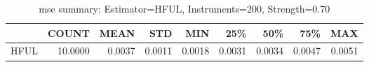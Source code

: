 \begin{table}[ht]
\centering
\caption{mse summary: Estimator=HFUL, Instruments=200, Strength=0.70}
\begin{tabular}{lrrrrrrrr}
\toprule
 & COUNT & MEAN & STD & MIN & 25\% & 50\% & 75\% & MAX \\
\midrule
HFUL & 10.0000 & 0.0037 & 0.0011 & 0.0018 & 0.0031 & 0.0034 & 0.0047 & 0.0051 \\
\bottomrule
\end{tabular}
\end{table}
